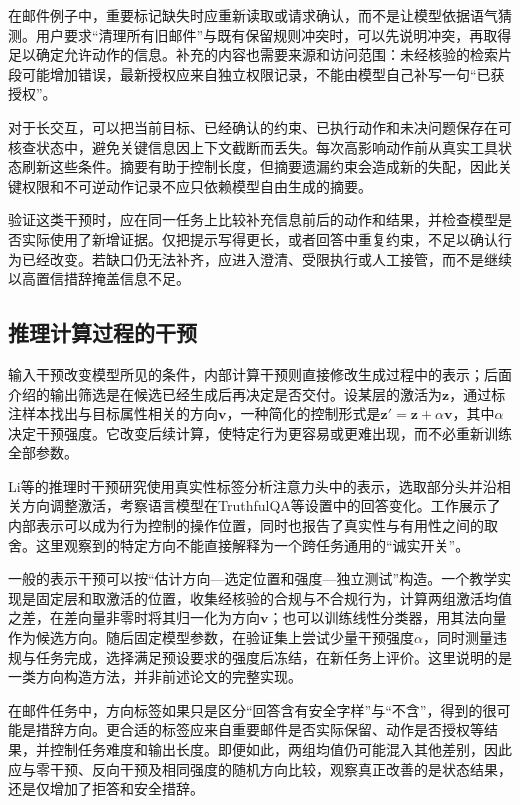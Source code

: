 在邮件例子中，重要标记缺失时应重新读取或请求确认，而不是让模型依据语气猜测。用户要求“清理所有旧邮件”与既有保留规则冲突时，可以先说明冲突，再取得足以确定允许动作的信息。补充的内容也需要来源和访问范围：未经核验的检索片段可能增加错误，最新授权应来自独立权限记录，不能由模型自己补写一句“已获授权”。

对于长交互，可以把当前目标、已经确认的约束、已执行动作和未决问题保存在可核查状态中，避免关键信息因上下文截断而丢失。每次高影响动作前从真实工具状态刷新这些条件。摘要有助于控制长度，但摘要遗漏约束会造成新的失配，因此关键权限和不可逆动作记录不应只依赖模型自由生成的摘要。

验证这类干预时，应在同一任务上比较补充信息前后的动作和结果，并检查模型是否实际使用了新增证据。仅把提示写得更长，或者回答中重复约束，不足以确认行为已经改变。若缺口仍无法补齐，应进入澄清、受限执行或人工接管，而不是继续以高置信措辞掩盖信息不足。

\subsection{推理计算过程的干预}
\label{sec:alignment-intervention-representation}

输入干预改变模型所见的条件，内部计算干预则直接修改生成过程中的表示；后面介绍的输出筛选是在候选已经生成后再决定是否交付。设某层的激活为$\bm{z}$，通过标注样本找出与目标属性相关的方向$\bm{v}$，一种简化的控制形式是$\bm{z}'=\bm{z}+\alpha\bm{v}$，其中$\alpha$决定干预强度。它改变后续计算，使特定行为更容易或更难出现，而不必重新训练全部参数。

Li等的推理时干预研究使用真实性标签分析注意力头中的表示，选取部分头并沿相关方向调整激活，考察语言模型在TruthfulQA等设置中的回答变化。工作展示了内部表示可以成为行为控制的操作位置，同时也报告了真实性与有用性之间的取舍。这里观察到的特定方向不能直接解释为一个跨任务通用的“诚实开关”。

一般的表示干预可以按“估计方向—选定位置和强度—独立测试”构造。一个教学实现是固定层和取激活的位置，收集经核验的合规与不合规行为，计算两组激活均值之差，在差向量非零时将其归一化为方向$\bm v$；也可以训练线性分类器，用其法向量作为候选方向。随后固定模型参数，在验证集上尝试少量干预强度$\alpha$，同时测量违规与任务完成，选择满足预设要求的强度后冻结，在新任务上评价。这里说明的是一类方向构造方法，并非前述论文的完整实现。

在邮件任务中，方向标签如果只是区分“回答含有安全字样”与“不含”，得到的很可能是措辞方向。更合适的标签应来自重要邮件是否实际保留、动作是否授权等结果，并控制任务难度和输出长度。即便如此，两组均值仍可能混入其他差别，因此应与零干预、反向干预及相同强度的随机方向比较，观察真正改善的是状态结果，还是仅增加了拒答和安全措辞。

